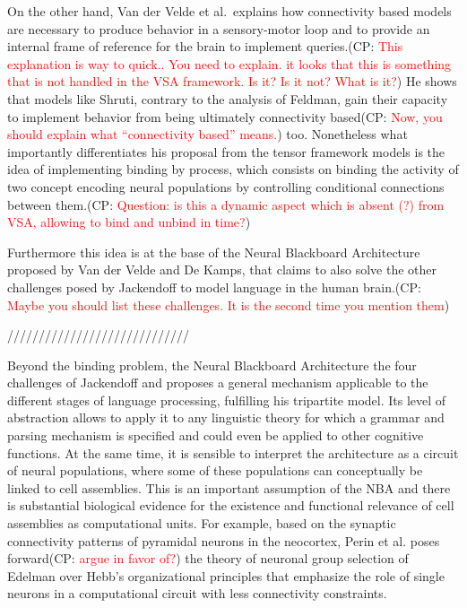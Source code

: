 \documentclass[10pt]{article}
\newcommand{\noteCP}[1]{(CP: \textcolor{red}{#1})}
\begin{document}
On the
other hand, Van der Velde et al.\cite{van_der_Velde_2015}~explains how
connectivity based models are necessary to produce behavior in a
sensory-motor loop and to provide an internal frame of reference for the
brain to implement queries.\noteCP{This explanation is way to quick..
  You need to explain. it looks that this is something that is not
  handled in the VSA framework. Is it? Is it not? What is it?} He
shows that models like Shruti\cite{Shastri_1993}, contrary to the
analysis of Feldman\cite{Feldman_2012}, gain their capacity to
implement behavior from being ultimately connectivity
based\noteCP{Now, you should explain what ``connectivity based''
  means.} too. Nonetheless what importantly differentiates his
proposal from the tensor framework models is the idea of implementing
binding by process, which consists on binding the activity of two
concept encoding neural populations by controlling conditional
connections between them.\noteCP{Question: is this a dynamic aspect
  which is absent (?) from VSA, allowing to bind and unbind in time?}


Furthermore this idea is at the base of the Neural Blackboard
Architecture proposed by Van der Velde and De
Kamps\cite{van_der_Velde_2006}, that claims to also solve the other
challenges posed by Jackendoff to model language in the human
brain.\noteCP{Maybe you should list these challenges. It is the second
  time you mention them}  

/////////////////////////////

Beyond the binding problem, the Neural Blackboard Architecture the
four challenges of Jackendoff and proposes a general mechanism
applicable to the different stages of language processing, fulfilling
his tripartite model\cite{Jackendoff_2002a}. Its level of abstraction
allows to apply it to any linguistic theory for which a grammar and
parsing mechanism is specified and could even be applied to other
cognitive functions. At the same time, it is sensible to interpret the
architecture as a circuit of neural populations, where some of these
populations can conceptually be linked to cell assemblies. This is an
important assumption of the NBA and there is substantial biological
evidence for the existence and functional relevance of cell assemblies
as computational units\cite{Huyck_2013}. For example, based on the
synaptic connectivity patterns of pyramidal neurons in the neocortex,
Perin et al.\cite{Perin_2011} poses forward\noteCP{argue in favor of?}
the theory of neuronal group selection of
Edelman\cite{edelman1987neural} over Hebb's organizational
principles\cite{hebb2005organization} that emphasize the role of
single neurons in a computational circuit with less connectivity
constraints.
\end{document}
